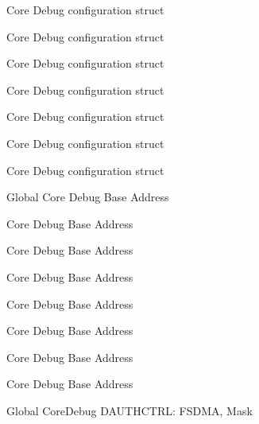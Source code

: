 \begin{DoxyRefList}
\label{deprecated__deprecated000551}%
%
Core Debug configuration struct 

\label{deprecated__deprecated000230}%
%
Core Debug configuration struct 

\label{deprecated__deprecated000653}%
%
Core Debug configuration struct 

\label{deprecated__deprecated000293}%
%
Core Debug configuration struct 

\label{deprecated__deprecated000448}%
%
Core Debug configuration struct 

\label{deprecated__deprecated000372}%
%
Core Debug configuration struct 

\label{deprecated__deprecated000100}%
%
Core Debug configuration struct  
\item[Global \doxylink{group___c_m_s_i_s___core_debug_ga680604dbcda9e9b31a1639fcffe5230b}{Core\+Debug\+\_\+\+BASE} ]\label{deprecated__deprecated000229}%
%
Core Debug Base Address 

\label{deprecated__deprecated000153}%
%
Core Debug Base Address 

\label{deprecated__deprecated000550}%
%
Core Debug Base Address 

\label{deprecated__deprecated000652}%
%
Core Debug Base Address 

\label{deprecated__deprecated000099}%
%
Core Debug Base Address 

\label{deprecated__deprecated000371}%
%
Core Debug Base Address 

\label{deprecated__deprecated000292}%
%
Core Debug Base Address 

\label{deprecated__deprecated000447}%
%
Core Debug Base Address  
\item[Global \doxylink{group___c_m_s_i_s___s_c_b_gab7f3f76af0236f8d3d3a090f50d4841a}{Core\+Debug\+\_\+\+DAUTHCTRL\+\_\+\+FSDMA\+\_\+\+Msk} ]\label{deprecated__deprecated000637}%
%
Core\+Debug DAUTHCTRL\+: FSDMA, Mask 


\end{DoxyRefList}
